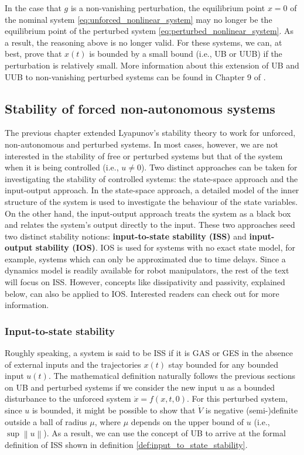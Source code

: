 In the case that $g$ is a non-vanishing perturbation, the equilibrium point $x = 0$ of the nominal system \eqref{eq:unforced_nonlinear_system} may no longer be the equilibrium point of the perturbed system \eqref{eq:perturbed_nonlinear_system}. As a result, the reasoning above is no longer valid. For these systems, we can, at best, prove that $x\left(t\right)$ is bounded by a small bound (i.e., UB or UUB) if the perturbation is relatively small. More information about this extension of UB and UUB to non-vanishing perturbed systems can be found in Chapter 9 of \cite{khalilNonlinearSystems2002}.

\subsection{Stability of forced non-autonomous systems}

The previous chapter extended Lyapunov's stability theory to work for unforced, non-autonomous and perturbed systems. In most cases, however, we are not interested in the stability of free or perturbed systems but that of the system when it is being controlled (i.e., $u \neq 0$). Two distinct approaches can be taken for investigating the stability of controlled systems: the state-space approach and the input-output approach. In the state-space approach, a detailed model of the inner structure of the system is used to investigate the behaviour of the state variables. On the other hand, the input-output approach treats the system as a black box and relates the system's output directly to the input. These two approaches seed two distinct stability notions: \textbf{input-to-state stability (ISS)} and \textbf{input-output stability (IOS)}. IOS is used for systems with no exact state model, for example, systems which can only be approximated due to time delays. Since a dynamics model is readily available for robot manipulators, the rest of the text will focus on ISS. However, concepts like dissipativity and passivity, explained below, can also be applied to IOS. Interested readers can check out \cite{khalilNonlinearControl2015} for more information.

\subsubsection{Input-to-state stability}

Roughly speaking, a system is said to be ISS if it is GAS or GES in the absence of external inputs and the trajectories $x \left( t \right)$ stay bounded for any bounded input $u \left( t \right)$. The mathematical definition naturally follows the previous sections on UB and perturbed systems if we consider the new input u as a bounded disturbance to the unforced system $\dot{ x }= f \left( x, t, 0 \right)$. For this perturbed system, since $u$ is bounded, it might be possible to show that $\dot{ V }$ is negative (semi-)definite outside a ball of radius $\mu$, where $\mu$ depends on the upper bound of $u$ (i.e., $\sup{\left\|u\right\|}$). As a result, we can use the concept of UB to arrive at the formal definition of ISS shown in definition \ref{def:input_to_state_stability}.

